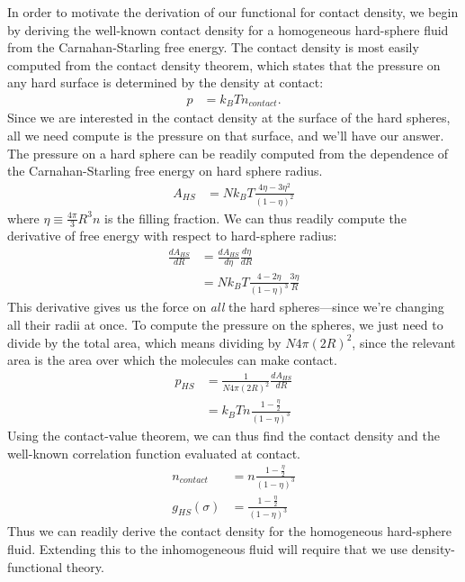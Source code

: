 \documentclass[letterpaper,twocolumn,amsmath,amssymb,prb]{revtex4-1}
\newcommand{\derivation}[1]{} %
\begin{document}
In order to motivate the derivation of our functional for contact
density, we begin by deriving the well-known contact density for a
homogeneous hard-sphere fluid from the Carnahan-Starling free energy.
The contact density is most easily computed from the contact density
theorem, which states that the pressure on any hard surface is
determined by the density at contact:
\begin{align}
  p &= k_BT n_\textit{contact}.
\end{align}
Since we are interested in the contact density at the surface of the
hard spheres, all we need compute is the pressure on that surface, and
we'll have our answer.  The pressure on a hard sphere can be readily
computed from the dependence of the Carnahan-Starling free energy on
hard sphere radius.
\begin{align}
  A_{HS} &= Nk_BT \frac{4\eta - 3\eta^2}{(1-\eta)^2}
\end{align}
where $\eta \equiv \frac{4\pi}{3} R^3 n$ is the filling fraction.  We
can thus readily compute the derivative of free energy with respect to
hard-sphere radius:
\begin{align}
  \frac{dA_{HS}}{dR} &= \frac{dA_{HS}}{d\eta} \frac{d\eta}{dR} \\
  \derivation{
    &= Nk_BT \left( \frac{4 - 6\eta}{(1-\eta)^2} + 2 \frac{4\eta - 3\eta^2}{(1-\eta)^3} \right) \frac{d\eta}{dR}
    \\
    &= Nk_BT \frac{4 - 4\eta - 6\eta + 6\eta^2 + 8\eta - 6\eta^2}{(1-\eta)^3} \frac{d\eta}{dR}
    \\
    &= Nk_BT \frac{4 - 2\eta}{(1-\eta)^3} \frac{d\eta}{dR}
    \\
  }
  &= Nk_BT \frac{4 - 2\eta}{(1-\eta)^3} \frac{3 \eta}{R} \label{eq:dAhsdR}
\end{align}
This derivative gives us the force on \emph{all} the hard
spheres---since we're changing all their radii at once.  To compute
the pressure on the spheres, we just need to divide by the total area,
which means dividing by $N 4\pi (2R)^2$, since the relevant area
is the area over which the molecules can make contact.
\begin{align}
  p_{HS} &= \frac{1}{N 4\pi (2R)^2} \frac{dA_{HS}}{dR} \\
  \derivation{
    &= \frac14 \frac{1}{N 4\pi R^2} Nk_BT \frac{4 - 2\eta}{(1-\eta)^3} \frac{3 \eta}{R} \\
    &= \frac{3}{4\pi R^3} \eta k_BT \frac{1 -
      \frac{\eta}2}{(1-\eta)^3} \\
  }
  &= k_BT n \frac{1 - \frac{\eta}2}{(1-\eta)^3}
\end{align}
Using the contact-value theorem, we can thus find the contact density
and the well-known correlation function evaluated at contact.
\begin{align}
  n_\textit{contact} &= n \frac{1 - \frac{\eta}2}{(1-\eta)^3} \\
  g_{HS}(\sigma) &= \frac{1 - \frac{\eta}2}{(1-\eta)^3}
\end{align}
Thus we can readily derive the contact density for the homogeneous
hard-sphere fluid.  Extending this to the inhomogeneous fluid will
require that we use density-functional theory.
\end{document}
